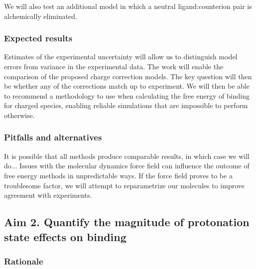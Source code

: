 \documentclass[10pt,final]{article}
\begin{document}

We will also test an additional model in which a neutral ligand:counterion pair is alchemically eliminated.

\subsubsection*{Expected results}
Estimates of the experimental uncertainty will allow us to distinguish model errors from variance in the experimental data.
The work will enable the comparison of the proposed charge correction models. 
The key question will then be whether any of the corrections  match up to experiment.
We will then be able to recommend a methodology to use when calculating the free energy of binding for charged species, enabling reliable simulations that are impossible to perform otherwise.
\subsubsection*{Pitfalls and alternatives}

It is possible that all methods produce comparable results, in which case we will do... 
Issues with the molecular dynamics force field can influence the outcome of free energy methods in unpredictable ways. If the force field proves to be a troublesome factor, we will attempt to reparametrize our molecules to improve agreement with experiments.

\subsection*{Aim 2. Quantify the magnitude of protonation state effects on binding}
\subsubsection*{Rationale}
\end{document}
